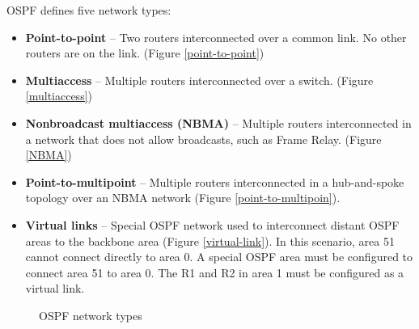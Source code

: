 OSPF defines five network types:

\begin{itemize}
	\item \textbf{Point-to-point} -- Two routers interconnected over a common link. No other routers are on the link. (Figure \ref{point-to-point})
	\item \textbf{Multiaccess} -- Multiple routers interconnected over a switch. (Figure \ref{multiaccess})
	\item \textbf{Nonbroadcast multiaccess (NBMA)} -- Multiple routers interconnected in a network that does not allow broadcasts, such as Frame Relay. (Figure \ref{NBMA})
	\item \textbf{Point-to-multipoint} -- Multiple routers interconnected in a hub-and-spoke topology over an NBMA network (Figure \ref{point-to-multipoin}).
	\item \textbf{Virtual links} -- Special OSPF network used to interconnect distant OSPF areas to the backbone area (Figure \ref{virtual-link}). In this scenario, area 51 cannot connect directly to area 0. A special OSPF area must be configured to connect area 51 to area 0. The R1 and R2 in area 1 must be configured as a virtual link.
\end{itemize}
	
\begin{figure}%
	\centering
	\caption{OSPF network types}
	\label{network-types}
	\end{figure}
	
